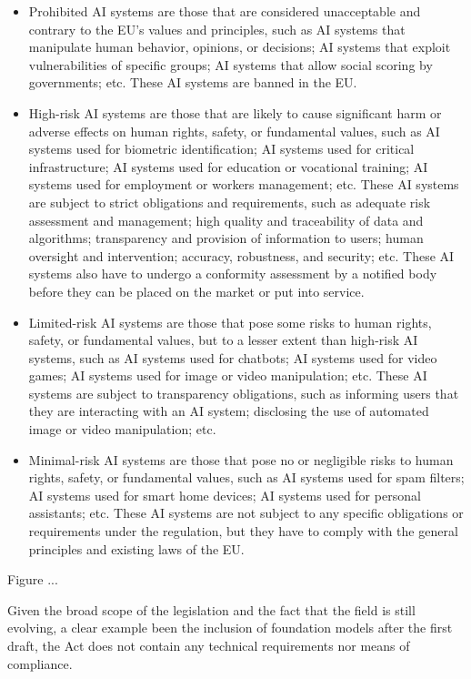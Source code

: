 \documentclass{article}
\begin{document}
	\begin{itemize}	
		\item Prohibited AI systems are those that are considered unacceptable and contrary to the EU’s values and principles, such as AI systems that manipulate human behavior, opinions, or decisions; AI systems that exploit vulnerabilities of specific groups; AI systems that allow social scoring by governments; etc. These AI systems are banned in the EU.
		
		\item High-risk AI systems are those that are likely to cause significant harm or adverse effects on human rights, safety, or fundamental values, such as AI systems used for biometric identification; AI systems used for critical infrastructure; AI systems used for education or vocational training; AI systems used for employment or workers management; etc. These AI systems are subject to strict obligations and requirements, such as adequate risk assessment and management; high quality and traceability of data and algorithms; transparency and provision of information to users; human oversight and intervention; accuracy, robustness, and security; etc. These AI systems also have to undergo a conformity assessment by a notified body before they can be placed on the market or put into service.
		
		\item Limited-risk AI systems are those that pose some risks to human rights, safety, or fundamental values, but to a lesser extent than high-risk AI systems, such as AI systems used for chatbots; AI systems used for video games; AI systems used for image or video manipulation; etc. These AI systems are subject to transparency obligations, such as informing users that they are interacting with an AI system; disclosing the use of automated image or video manipulation; etc.
		
		\item Minimal-risk AI systems are those that pose no or negligible risks to human rights, safety, or fundamental values, such as AI systems used for spam filters; AI systems used for smart home devices; AI systems used for personal assistants; etc. These AI systems are not subject to any specific obligations or requirements under the regulation, but they have to comply with the general principles and existing laws of the EU.
	\end{itemize}
	
	Figure ... 
	
	Given the broad scope of the legislation and the fact that the field is still evolving, a clear example been the inclusion of foundation models after the first draft, the Act does not contain any technical requirements nor means of compliance.
	
\end{document}
